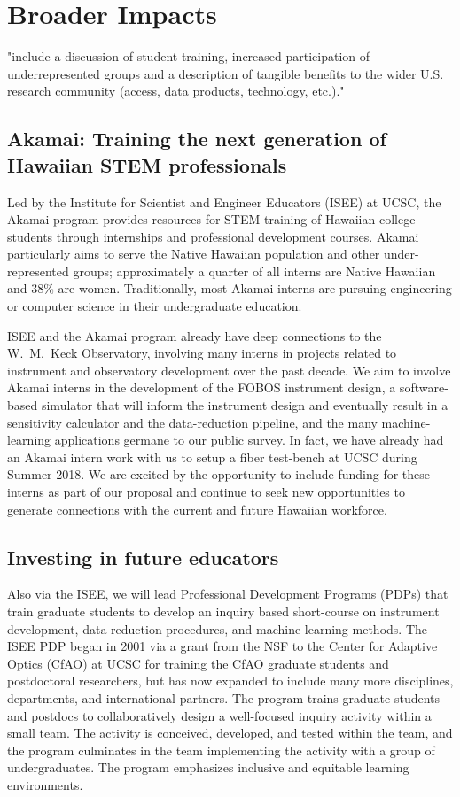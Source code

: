 \documentclass[oneside,11pt]{amsart}
\newcommand{\comment}[2][todo]{{\color{#1}[[{\bf #2}]]}}
\begin{document}
\section{Broader Impacts}
\label{sec:bi}

"include a discussion of student training, increased participation of
underrepresented groups and a description of tangible benefits to the
wider U.S. research community (access, data products, technology,
etc.)."

\subsection{Akamai: Training the next generation of Hawaiian STEM professionals}

Led by the Institute for Scientist and Engineer Educators (ISEE) at
UCSC, the Akamai program provides resources for STEM training of
Hawaiian college students through internships and professional
development courses.  Akamai particularly aims to serve the Native
Hawaiian population and other under-represented groups; approximately a
quarter of all interns are Native Hawaiian and 38\% are women.
Traditionally, most Akamai interns are pursuing engineering or 
computer science in their undergraduate education.

ISEE and the Akamai program already have deep connections to the
W.~M.~Keck Observatory, involving many interns in projects related to
instrument and observatory development over the past decade.  We aim to
involve Akamai interns in the development of the FOBOS instrument
design, a software-based simulator that will inform the instrument
design and eventually result in a sensitivity calculator and the
data-reduction pipeline, and the many machine-learning applications
germane to our public survey.  In fact, we have already had an Akamai
intern work with us to setup a fiber test-bench at UCSC during Summer
2018.  We are excited by the opportunity to include funding for these
interns as part of our proposal and continue to seek new opportunities
to generate connections with the current and future Hawaiian workforce.

\subsection{Investing in future educators}

Also via the ISEE, we will lead Professional Development Programs (PDPs)
that train graduate students to develop an inquiry based short-course on
instrument development, data-reduction procedures, and machine-learning
methods.  The ISEE PDP began in 2001 via a grant from the NSF to the
Center for Adaptive Optics (CfAO) at UCSC for training the CfAO graduate
students and postdoctoral researchers, but has now expanded to include
many more disciplines, departments, and international partners.  The
program trains graduate students and postdocs to collaboratively design
a well-focused inquiry activity within a small team.  The activity is
conceived, developed, and tested within the team, and the program
culminates in the team implementing the activity with a group of
undergraduates.  The program emphasizes inclusive and equitable learning
environments.
\end{document}
